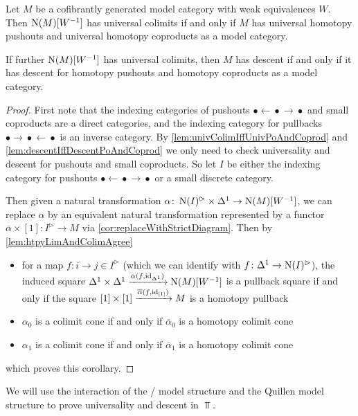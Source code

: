 \begin{corollary}\label{cor:sufficientToProveInModCat}
    Let $M$ be a cofibrantly generated model category with weak equivalences $W$. 
    Then $\operatorname{N}(M)[W^{-1}]$ has universal colimits if and only if $M$ has universal homotopy pushouts and universal homotopy coproducts as a model category.
    
    If further $\operatorname{N}(M)[W^{-1}]$ has universal colimits, then $M$ has descent if and only if it has descent for homotopy pushouts and homotopy coproducts as a model category.
    \begin{proof}
        First note that the indexing categories of pushouts $\bullet\xleftarrow{}\bullet\xrightarrow{}\bullet$ and small coproducts are a direct categories, and the indexing category for pullbacks $\bullet\xrightarrow{}\bullet\xleftarrow{}\bullet$ is an inverse category.
        By \cref{lem:univColimIffUnivPoAndCoprod} and \cref{lem:descentIffDescentPoAndCoprod} we only need to check universality and descent for pushouts and small coproducts.
        So let $I$ be either the indexing category for pushouts $\bullet\xleftarrow{}\bullet\xrightarrow{}\bullet$ or a small discrete category.

        Then given a natural transformation $\alpha\colon\operatorname{N}(I)^{\rhd}\times\Delta^1\to\operatorname{N}(M)[W^{-1}]$, we can replace $\alpha$ by an equivalent natural transformation represented by a functor $\overline{\alpha}\times[1]\colon I^{\rhd}\to M$ via \cref{cor:replaceWithStrictDiagram}.
        Then by \cref{lem:htpyLimAndColimAgree}
        \begin{itemize}
            \item for a map $f\colon i\to j\in I^{\rhd}$ (which we can identify with $f\colon\Delta^1\to\operatorname{N}(I)^{\rhd}$), the induced square $\Delta^1\times\Delta^1\xrightarrow{\alpha(f,\text{id}_{\Delta^1})}\operatorname{N}(M)[W^{-1}]$ is a pullback square if and only if the square $[1]\times[1]\xrightarrow{\overline{\alpha}(f,\text{id}_{[1]})}M$ is a homotopy pullback
            \item $\alpha_0$ is a colimit cone if and only if $\overline{\alpha}_0$ is a homotopy colimit cone
            \item $\alpha_1$ is a colimit cone if and only if $\overline{\alpha}_1$ is a homotopy colimit cone
        \end{itemize}
        which proves this corollary.
    \end{proof}
\end{corollary}
We will use the interaction of the \Strom/ model structure and the Quillen model structure to prove universality and descent in $\Top$.
